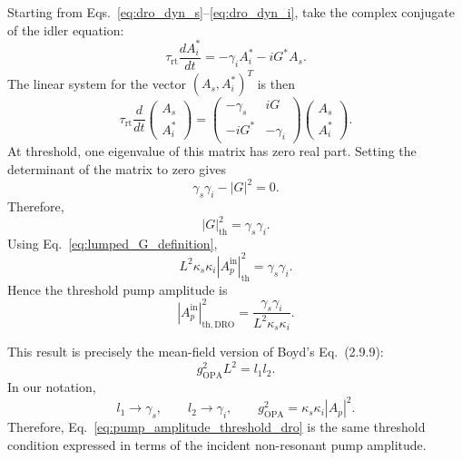 \begin{resolucao}[Solution]
    Starting from Eqs.~\eqref{eq:dro_dyn_s}--\eqref{eq:dro_dyn_i}, take the complex conjugate of the idler equation:
    \begin{equation}
        \tau_{\mathrm{rt}}
        \frac{dA_i^*}{dt}
        =
        -\gamma_iA_i^*
        -
        iG^*A_s.
        \label{eq:idler_conjugate}
    \end{equation}
    The linear system for the vector $(A_s,A_i^*)^T$ is then
    \begin{equation}
        \tau_{\mathrm{rt}}
        \frac{d}{dt}
        \begin{pmatrix}
            A_s\\
            A_i^*
        \end{pmatrix}
        =
        \begin{pmatrix}
            -\gamma_s & iG\\
            -iG^* & -\gamma_i
        \end{pmatrix}
        \begin{pmatrix}
            A_s\\
            A_i^*
        \end{pmatrix}.
        \label{eq:linear_matrix}
    \end{equation}
    At threshold, one eigenvalue of this matrix has zero real part. Setting the determinant of the matrix to zero gives
    \begin{equation}
        \gamma_s\gamma_i-|G|^2=0.
    \end{equation}
    Therefore,
    \begin{equation}
        |G|^2_{\mathrm{th}}
        =
        \gamma_s\gamma_i.
        \label{eq:G_threshold}
    \end{equation}
    Using Eq.~\eqref{eq:lumped_G_definition},
    \begin{equation}
        L^2\kappa_s\kappa_i
        |A_p^{\mathrm{in}}|_{\mathrm{th}}^2
        =
        \gamma_s\gamma_i.
    \end{equation}
    Hence the threshold pump amplitude is
    \begin{equation}
        \boxed{
        |A_p^{\mathrm{in}}|_{\mathrm{th,DRO}}^2
        =
        \frac{
            \gamma_s\gamma_i
        }{
            L^2\kappa_s\kappa_i
        }
        }.
        \label{eq:pump_amplitude_threshold_dro}
    \end{equation}

    This result is precisely the mean-field version of Boyd's Eq.~(2.9.9):
    \begin{equation}
        g_{\mathrm{OPA}}^2L^2=l_1l_2.
        \tag{Boyd Eq.~2.9.9}
    \end{equation}
    In our notation,
    \[
        l_1\rightarrow \gamma_s,
        \qquad
        l_2\rightarrow \gamma_i,
        \qquad
        g_{\mathrm{OPA}}^2=\kappa_s\kappa_i|A_p|^2.
    \]
    Therefore, Eq.~\eqref{eq:pump_amplitude_threshold_dro} is the same threshold condition expressed in terms of the incident non-resonant pump amplitude.


\end{resolucao}
